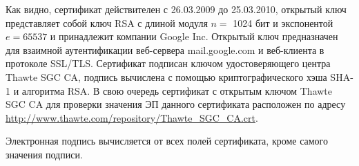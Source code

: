 Как видно, сертификат действителен с 26.03.2009 до 25.03.2010, открытый ключ представляет собой ключ RSA с длиной модуля $n=$ 1024 бит и экспонентой $e = 65537$ и принадлежит компании Google Inc. Открытый ключ предназначен для взаимной аутентификации веб-сервера mail.google.com и веб-клиента в протоколе SSL/TLS. Сертификат подписан ключом удостоверяющего центра Thawte SGC CA, подпись вычислена с помощью криптографического хэша SHA-1 и алгоритма RSA. В свою очередь сертификат с открытым ключом Thawte SGC CA для проверки значения ЭП данного сертификата расположен по адресу \url{http://www.thawte.com/repository/Thawte\_SGC\_CA.crt}.

Электронная подпись вычисляется от всех полей сертификата, кроме самого значения подписи.

